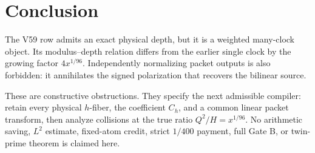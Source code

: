\section{Conclusion}

The V59 row admits an exact physical depth, but it is a weighted many-clock object.
Its modulus--depth relation differs from the earlier single clock by the growing
factor $4x^{1/96}$.  Independently normalizing packet outputs is also forbidden: it
annihilates the signed polarization that recovers the bilinear source.

These are constructive obstructions.  They specify the next admissible compiler:
retain every physical $h$-fiber, the coefficient $C_h$, and a common linear packet
transform, then analyze collisions at the true ratio $Q^2/H=x^{1/96}$.  No arithmetic
saving, $L^2$ estimate, fixed-atom credit, strict $1/400$ payment, full Gate B, or
twin-prime theorem is claimed here.
